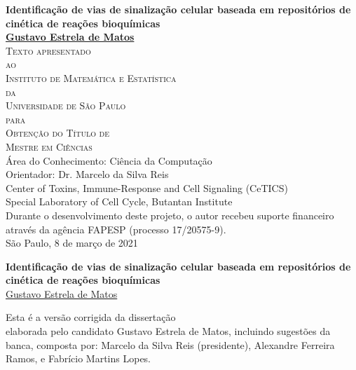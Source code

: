 \documentclass[12pt, twoside, bibliography=totoc]{report}
\numberwithin{mydefinition}{section}
\numberwithin{mytheorem}{section}
\numberwithin{mylemma}{section}
\numberwithin{corollary}{section}
\begin{document}
\thispagestyle{empty}
\begin{center}
{\Large
{\bf Identificação de vias de sinalização celular baseada em
    repositórios de cinética de reações bioquímicas}\\
\bigskip
\bigskip
\bigskip
\bigskip
    {\bf \href{mailto:gustavo.estrela.matos@gmail.com}{Gustavo Estrela de Matos}}\\
\bigskip
\bigskip
\bigskip
\bigskip
\textsc{
    Texto apresentado\\[-0.25cm] 
    ao\\[-0.25cm]
    Instituto de Matemática e Estatística\\[-0.25cm]
    da\\[-0.25cm]
    Universidade de São Paulo\\[-0.25cm]
    para\\[-0.25cm]
    Obtenção do Título de\\
    Mestre em Ciências\\
    }
\bigskip
\bigskip
\bigskip
\bigskip
Área do Conhecimento: Ciência da Computação\\
\bigskip
Orientador: Dr. Marcelo da Silva Reis\\
\bigskip
\bigskip
\bigskip
\bigskip
\bigskip
\bigskip
\bigskip
\bigskip
Center of Toxins, Immune-Response and Cell Signaling (CeTICS)\\
\bigskip
Special Laboratory of Cell Cycle, Butantan Institute\\
\bigskip
\bigskip
{\normalsize Durante o desenvolvimento deste projeto, o autor recebeu
    suporte financeiro através da agência FAPESP (processo 17/20575-9).}\\
\bigskip
\bigskip
\bigskip
São Paulo, 8 de março de 2021
}
\end{center}
\newpage


\thispagestyle{empty}
\begin{center}
{\Large
{\bf Identificação de vias de sinalização celular baseada em
    repositórios de cinética de reações bioquímicas}\\
\bigskip
\bigskip
\bigskip
\bigskip
\bigskip
\bigskip
\bigskip
\bigskip
\bigskip
    {\href{mailto:gustavo.estrela.matos@gmail.com}{Gustavo Estrela de Matos}}\\
\bigskip
\bigskip
\bigskip
\bigskip
\bigskip
\bigskip
\bigskip
\bigskip
\bigskip
\bigskip
\bigskip
\bigskip
\bigskip
\bigskip
\bigskip
\hfill
\begin{minipage}{15em}
{\small Esta é a versão corrigida da dissertação\\
elaborada pelo candidato Gustavo Estrela de Matos,
incluindo sugestões da banca, composta por: Marcelo da Silva Reis
(presidente), Alexandre Ferreira Ramos, e Fabrício Martins Lopes.}
\end{minipage}
\bigskip
\bigskip
}
\end{center}
\newpage
\end{document}
